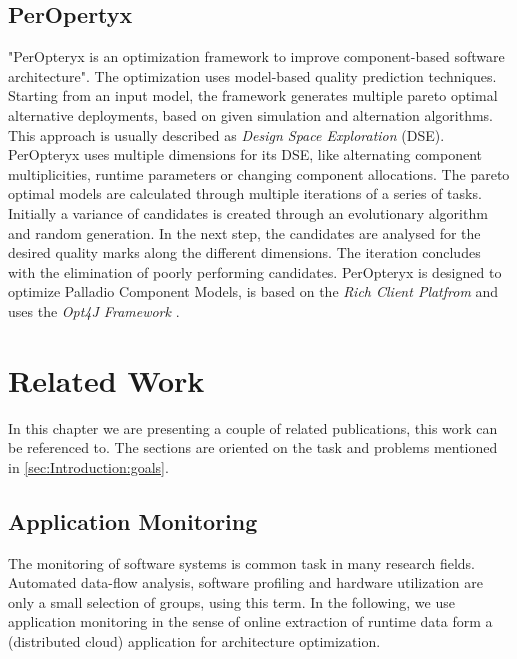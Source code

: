 \section{PerOpertyx}
\label{sec:Foundations:peropteryx}

"PerOpteryx is an optimization framework to improve component-based software architecture"\cite{PerOpteryx.b}. The optimization uses model-based quality prediction techniques. Starting from an input model, the framework generates multiple pareto optimal alternative deployments, based on given simulation and alternation algorithms. This approach is usually described as \textit{Design Space Exploration} (DSE). PerOpteryx uses multiple dimensions for its DSE, like alternating component multiplicities, runtime parameters or changing component allocations. The pareto optimal models are calculated through multiple iterations of a series of tasks. Initially a variance of candidates is created through an evolutionary algorithm and random generation. In the next step, the candidates are analysed for the desired quality marks along the different dimensions. The iteration concludes with the elimination of poorly performing candidates. PerOpteryx is designed to optimize Palladio Component Models, is based on the \textit{Rich Client Platfrom} and uses the \textit{Opt4J Framework} \cite{Martens.2010}.


\chapter{Related Work}
\label{ch:RelatedWork}

In this chapter we are presenting a couple of related publications, this work can be referenced to. The sections are oriented on the task and problems mentioned in \autoref{sec:Introduction:goals}.


\section{Application Monitoring}
\label{sec:RelatedWork:appl_mon}

The monitoring of software systems is common task in many research fields. Automated data-flow analysis, software profiling and hardware utilization are only a small selection of groups, using this term. In the following, we use application monitoring in the sense of online extraction of runtime data form a (distributed cloud) application for architecture optimization.

